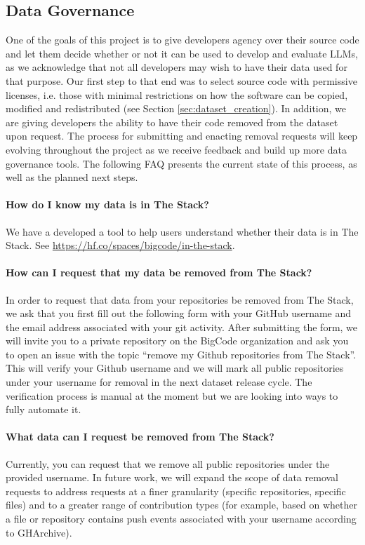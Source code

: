 \subsection{Data Governance}\label{sec:data_governance}
One of the goals of this project is to give developers agency over their source code and let them decide whether or not it can be used to develop and evaluate LLMs, as we acknowledge that not all developers may wish to have their data used for that purpose. Our first step to that end was to select source code with permissive licenses, i.e. those with minimal restrictions on how the software can be copied, modified and redistributed (see Section \ref{sec:dataset_creation}). In addition, we are giving developers the ability to have their code removed from the dataset upon request. The process for submitting and enacting removal requests will keep evolving throughout the project as we receive feedback and build up more data governance tools. The following FAQ presents the current state of this process, as well as the planned next steps.

\paragraph{How do I know my data is in The Stack?} We have a developed a tool to help users understand whether their data is in The Stack. See \url{https://hf.co/spaces/bigcode/in-the-stack}.

\paragraph{How can I request that my data be removed from The Stack?} In order to request that data from your repositories be removed from The Stack, we ask that you first fill out the following form with your GitHub username and the email address associated with your git activity. After submitting the form, we will invite you to a private repository on the BigCode organization and ask you to open an issue with the topic “remove my Github repositories from The Stack”. This will verify your Github username and we will mark all public repositories under your username for removal in the next dataset release cycle. The verification process is manual at the moment but we are looking into ways to fully automate it. 

\paragraph{What data can I request be removed from The Stack?} Currently, you can request that we remove all public repositories under the provided username. In future work, we will expand the scope of data removal requests to address requests at a finer granularity (specific repositories, specific files) and to a greater range of contribution types (for example, based on whether a file or repository contains push events associated with your username according to GHArchive).

